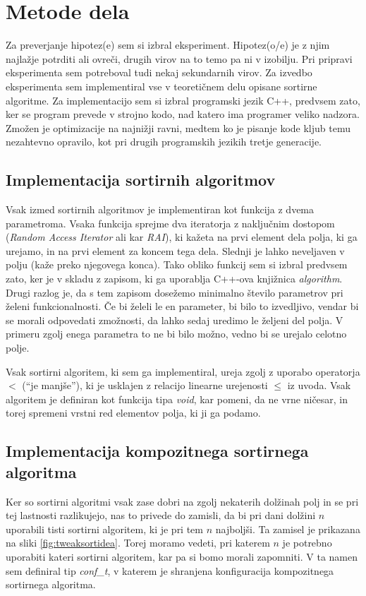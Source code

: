 \documentclass[a4paper,oneside,12pt]{article}
\begin{document}
\section{Metode dela}
Za preverjanje hipotez(e) sem si izbral eksperiment. Hipotez(o/e) je z njim najlažje
potrditi ali ovreči, drugih virov na to temo pa ni v izobilju. Pri pripravi eksperimenta
sem potreboval tudi nekaj sekundarnih virov. Za izvedbo eksperimenta sem implementiral vse 
v teoretičnem delu opisane sortirne algoritme. Za implementacijo sem si izbral programski 
jezik C++, predvsem zato, ker se program prevede v strojno kodo, nad katero ima programer
veliko nadzora. Zmožen je optimizacije na najnižji ravni, medtem ko je pisanje kode kljub
temu nezahtevno opravilo, kot pri drugih programskih jezikih tretje generacije.

\subsection{Implementacija sortirnih algoritmov}
\label{chapter:sortimplementation}
Vsak izmed sortirnih algoritmov je implementiran kot funkcija z dvema parametroma.
Vsaka funkcija sprejme dva iteratorja z naključnim dostopom (\emph{Random Access
Iterator} ali kar \emph{RAI}),
ki kažeta na prvi element dela polja, ki ga urejamo, in na prvi element za koncem tega dela.
Slednji je lahko neveljaven v polju (kaže preko njegovega konca).
Tako obliko funkcij sem si izbral predvsem zato, ker je v skladu z zapisom, ki ga uporablja
C++-ova knjižnica \emph{algorithm}. Drugi razlog je, da s tem zapisom dosežemo minimalno število
parametrov pri želeni funkcionalnosti. Če bi želeli le en parameter, bi bilo to
izvedljivo, vendar bi se morali odpovedati zmožnosti, da lahko sedaj uredimo le željeni
del polja. V primeru zgolj enega parametra to ne bi bilo možno, vedno bi se
urejalo celotno polje.

Vsak sortirni algoritem, ki sem ga implementiral, ureja zgolj z uporabo operatorja $<$
(``je manjše''), ki je usklajen z relacijo linearne urejenosti $\leq$ iz uvoda. Vsak
algoritem je definiran kot funkcija tipa \emph{void}, kar pomeni, da ne vrne ničesar, in
torej spremeni vrstni red elementov polja, ki ji ga podamo.

\subsection{Implementacija kompozitnega sortirnega algoritma}
\label{chapter:tweaksort}
Ker so sortirni algoritmi vsak zase dobri na zgolj nekaterih dolžinah polj in se pri tej
lastnosti razlikujejo, nas to privede do zamisli, da bi pri dani dolžini $n$ uporabili tisti
sortirni algoritem, ki je pri tem $n$ najboljši. Ta zamisel je prikazana na sliki \ref{fig:tweaksortidea}.
Torej moramo vedeti, pri katerem $n$ je
potrebno uporabiti kateri sortirni algoritem, kar pa si bomo morali zapomniti. V ta
namen sem definiral tip \emph{conf\_\!t}, v katerem je shranjena konfiguracija kompozitnega
sortirnega algoritma. 
\end{document}
